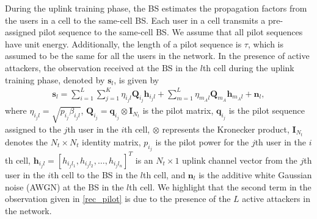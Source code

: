 \documentclass[conference]{IEEEtran}
\begin{document}
During the uplink training phase, the BS estimates the propagation factors from the users in a cell to the same-cell BS. Each user in a cell transmits a pre-assigned pilot sequence to the same-cell BS. We assume that all pilot sequences have unit energy. Additionally, the length of a pilot sequence is $\tau$, which is assumed to be the same for all the users in the network. In the presence of active attackers, the observation received at the $\textrm{BS}$ in the $l$th cell during the uplink training phase, denoted by $\mathbf{s}_{l}$, is given by
\begin{align}\label{rec_pilot}
\mathbf{s}_{l}=\sum_{i=1}^{L}\sum_{j=1}^{K}\eta_{i_{j}l}{\mathbf{Q}_{i_{j}}}\mathbf{h}_{i_{j}l}+\sum_{m=1}^L\eta_{m_{A}l}{\mathbf{Q}_{m_{A}}}\mathbf{h}_{m_{A}l} +\mathbf{n}_{l},
\end{align}
where $\eta_{i_{j}l} = \sqrt{p_{i_{j}}\beta_{i_{j}l}}$, $\mathbf{Q}_{i_{j}} = {\mathbf{q}_{i_{j}}}\otimes \mathbf{I}_{N_{t}}$ is the pilot matrix, $\mathbf{q}_{i_{j}}$ is the pilot sequence assigned to the $j$th user in the $i$th cell, $\otimes$ represents the Kronecker product, $\mathbf{I}_{N_{t}}$ denotes the $N_{t}\times{}N_{t}$ identity matrix, $p_{i_{j}}$ is the pilot power for the $j$th user in the $i$th cell, $\mathbf{h}_{i_{j}l}=[h_{i_{j}l_{1}},h_{i_{j}l_{2}},\dotsc,h_{i_{j}l_{n}}]^{T}$ is an $N_{t}\times1$ uplink channel vector from the $j$th user in the $i$th cell to the BS in the $l$th cell, and $\mathbf{n}_{l}$ is the additive white Gaussian noise (AWGN) at the BS in the $l$th cell. We highlight that the second term in the observation given in \eqref{rec_pilot} is due to the presence of the $L$ active attackers in the network.
\end{document}
